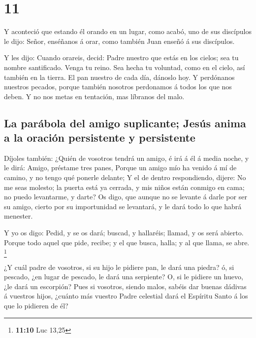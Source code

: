 \hypertarget{section-10}{%
\section{11}\label{section-10}}

 Y aconteció que estando él orando en un lugar, como acabó,
uno de sus discípulos le dijo: Señor, enséñanos á orar, como también
Juan enseñó á sus discípulos.

 Y les dijo: Cuando orareis, decid: Padre nuestro que estás
en los cielos; sea tu nombre santificado. Venga tu reino. Sea hecha tu
voluntad, como en el cielo, así también en la tierra.  El
pan nuestro de cada día, dánoslo hoy.  Y perdónanos nuestros
pecados, porque también nosotros perdonamos á todos los que nos deben. Y
no nos metas en tentación, mas líbranos del malo.

\hypertarget{la-paruxe1bola-del-amigo-suplicante-jesuxfas-anima-a-la-oraciuxf3n-persistente-y-persistente}{%
\subsection{La parábola del amigo suplicante; Jesús anima a la oración
persistente y
persistente}\label{la-paruxe1bola-del-amigo-suplicante-jesuxfas-anima-a-la-oraciuxf3n-persistente-y-persistente}}

 Díjoles también: ¿Quién de vosotros tendrá un amigo, é irá
á él á media noche, y le dirá: Amigo, préstame tres panes, 
Porque un amigo mío ha venido á mí de camino, y no tengo qué ponerle
delante;  Y el de dentro respondiendo, dijere: No me seas
molesto; la puerta está ya cerrada, y mis niños están conmigo en cama;
no puedo levantarme, y darte?  Os digo, que aunque no se
levante á darle por ser su amigo, cierto por su importunidad se
levantará, y le dará todo lo que habrá menester.

 Y yo os digo: Pedid, y se os dará; buscad, y hallaréis;
llamad, y os será abierto.  Porque todo aquel que pide,
recibe; y el que busca, halla; y al que llama, se abre. \footnote{\textbf{11:10}
  Luc 13,25}

 ¿Y cuál padre de vosotros, si su hijo le pidiere pan, le
dará una piedra? ó, si pescado, ¿en lugar de pescado, le dará una
serpiente?  O, si le pidiere un huevo, ¿le dará un
escorpión?  Pues si vosotros, siendo malos, sabéis dar
buenas dádivas á vuestros hijos, ¿cuánto más vuestro Padre celestial
dará el Espíritu Santo á los que lo pidieren de él?

